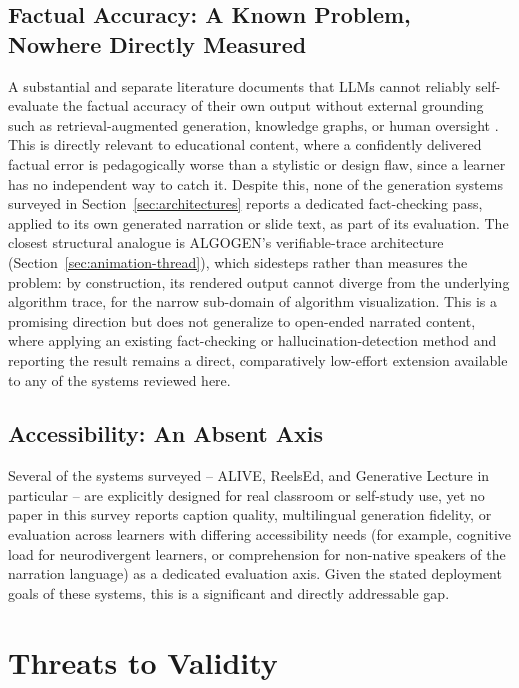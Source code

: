 \documentclass[journal]{IEEEtran}
\begin{document}
\subsection{Factual Accuracy: A Known Problem, Nowhere Directly Measured}

A substantial and separate literature documents that LLMs cannot reliably self-evaluate the factual accuracy of their own output without external grounding such as retrieval-augmented generation, knowledge graphs, or human oversight \cite{hallucination2026review}. This is directly relevant to educational content, where a confidently delivered factual error is pedagogically worse than a stylistic or design flaw, since a learner has no independent way to catch it. Despite this, none of the generation systems surveyed in Section~\ref{sec:architectures} reports a dedicated fact-checking pass, applied to its own generated narration or slide text, as part of its evaluation. The closest structural analogue is ALGOGEN's verifiable-trace architecture (Section~\ref{sec:animation-thread}), which sidesteps rather than measures the problem: by construction, its rendered output cannot diverge from the underlying algorithm trace, for the narrow sub-domain of algorithm visualization. This is a promising direction but does not generalize to open-ended narrated content, where applying an existing fact-checking or hallucination-detection method and reporting the result remains a direct, comparatively low-effort extension available to any of the systems reviewed here.

\subsection{Accessibility: An Absent Axis}

Several of the systems surveyed -- ALIVE, ReelsEd, and Generative Lecture in particular -- are explicitly designed for real classroom or self-study use, yet no paper in this survey reports caption quality, multilingual generation fidelity, or evaluation across learners with differing accessibility needs (for example, cognitive load for neurodivergent learners, or comprehension for non-native speakers of the narration language) as a dedicated evaluation axis. Given the stated deployment goals of these systems, this is a significant and directly addressable gap.

\section{Threats to Validity}
\label{sec:threats}
\end{document}
